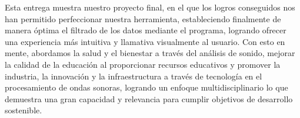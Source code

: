 \documentclass[letterpaper, 12pt]{article}
\begin{document}
Esta entrega muestra nuestro proyecto final, en el que los
logros conseguidos nos han permitido perfeccionar nuestra
herramienta, estableciendo finalmente de manera óptima el
filtrado de los datos mediante el programa, logrando
ofrecer una experiencia más intuitiva y llamativa
visualmente al usuario. Con esto en mente, abordamos la
salud y el bienestar a través del análisis de sonido,
mejorar la calidad de la educación al proporcionar recursos
educativos y promover la industria, la innovación y la
infraestructura a través de tecnología en el procesamiento
de ondas sonoras, logrando un enfoque multidisciplinario lo
que demuestra una gran capacidad y relevancia para cumplir
objetivos de desarrollo sostenible.

\nocite{source_code}

\printbibliography
\end{document}
